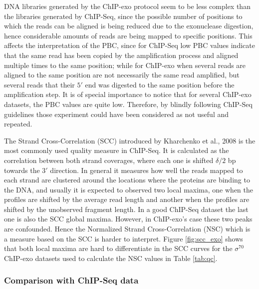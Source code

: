 \documentclass{bmcart}\usepackage[]{graphicx}\usepackage[]{color}
\newcommand{\sig}{\sigma^{70}}
\begin{document}
DNA libraries generated by the ChIP-exo protocol seem to be less
complex than the libraries generated by ChIP-Seq, since the possible
number of positions to which the reads can be aligned is being reduced
due to the exonuclease digestion, hence considerable amounts of reads
are being mapped to specific positions. This affects the
interpretation of the PBC, since for ChIP-Seq low PBC values indicate
that the same read has been copied by the amplification process and
aligned multiple times to the same position; while for ChIP-exo when
several reads are aligned to the same position are not necessarily the
same read amplified, but several reads that their $5\prime$ end was
digested to the same position before the amplification step. It is of
special importance to notice that for several ChIP-exo datasets, the
PBC values are quite low. Therefore, by blindly following ChIP-Seq
guidelines those experiment could have been considered as not useful
and repeated. 

The Strand Cross-Correlation (SCC) introduced by Kharchenko et al.,
2008 \cite{strandcc} is the most commonly used quality measure in
ChIP-Seq. It is calculated as the correlation between both strand
coverages, where each one is shifted $\delta / 2$ bp towards the
$3\prime$ direction. In general it measures how well the reads mapped
to each strand are clustered around the locations where the proteins
are binding to the DNA, and usually it is expected to observed two
local maxima, one when the profiles are shifted by the average read
length and another when the profiles are shifted by the unobserved
fragment length. In a good ChIP-Seq dataset the last one is also the
SCC global maxima. However, in ChIP-exo's case these two peaks are
confounded. Hence the Normalized Strand Cross-Correlation (NSC) which
is a measure based on the SCC is harder to interpret. Figure
\ref{fig:scc_exo} shows that both local maxima are hard to
differentiate in the SCC curves for the $\sig$ ChIP-exo datasets used
to calculate the NSC values in Table \ref{tab:qc}.

\subsubsection{Comparison with ChIP-Seq data}
\end{document}
